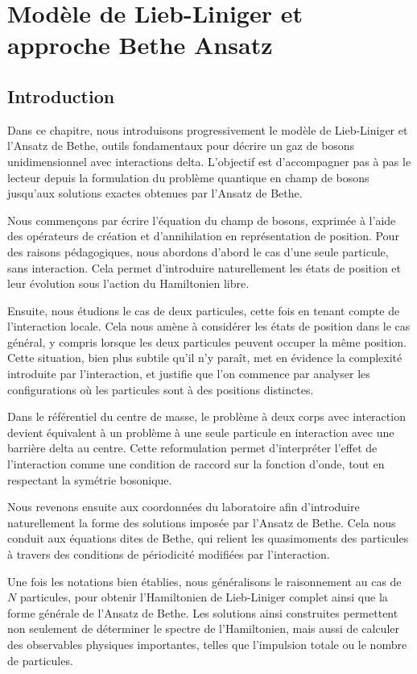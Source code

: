 \chapter{Modèle de Lieb-Liniger et approche Bethe Ansatz}
\minitoc

\section*{Introduction}

Dans ce chapitre, nous introduisons progressivement le modèle de Lieb-Liniger et l'Ansatz de Bethe, outils fondamentaux pour décrire un gaz de bosons unidimensionnel avec interactions delta. L'objectif est d'accompagner pas à pas le lecteur depuis la formulation du problème quantique en champ de bosons jusqu'aux solutions exactes obtenues par l'Ansatz de Bethe.

Nous commençons par écrire l'équation du champ de bosons, exprimée à l’aide des opérateurs de création et d’annihilation en représentation de position. Pour des raisons pédagogiques, nous abordons d’abord le cas d’une seule particule, sans interaction. Cela permet d’introduire naturellement les états de position et leur évolution sous l’action du Hamiltonien libre.

Ensuite, nous étudions le cas de deux particules, cette fois en tenant compte de l’interaction locale. Cela nous amène à considérer les états de position dans le cas général, y compris lorsque les deux particules peuvent occuper la même position. Cette situation, bien plus subtile qu’il n’y paraît, met en évidence la complexité introduite par l’interaction, et justifie que l’on commence par analyser les configurations où les particules sont à des positions distinctes.

Dans le référentiel du centre de masse, le problème à deux corps avec interaction devient équivalent à un problème à une seule particule en interaction avec une barrière delta au centre. Cette reformulation permet d’interpréter l’effet de l’interaction comme une condition de raccord sur la fonction d’onde, tout en respectant la symétrie bosonique.

Nous revenons ensuite aux coordonnées du laboratoire afin d’introduire naturellement la forme des solutions imposée par l’Ansatz de Bethe. Cela nous conduit aux équations dites de Bethe, qui relient les quasimoments des particules à travers des conditions de périodicité modifiées par l’interaction.

Une fois les notations bien établies, nous généralisons le raisonnement au cas de \(N\) particules, pour obtenir l’Hamiltonien de Lieb-Liniger complet ainsi que la forme générale de l’Ansatz de Bethe. Les solutions ainsi construites permettent non seulement de déterminer le spectre de l’Hamiltonien, mais aussi de calculer des observables physiques importantes, telles que l’impulsion totale ou le nombre de particules.

